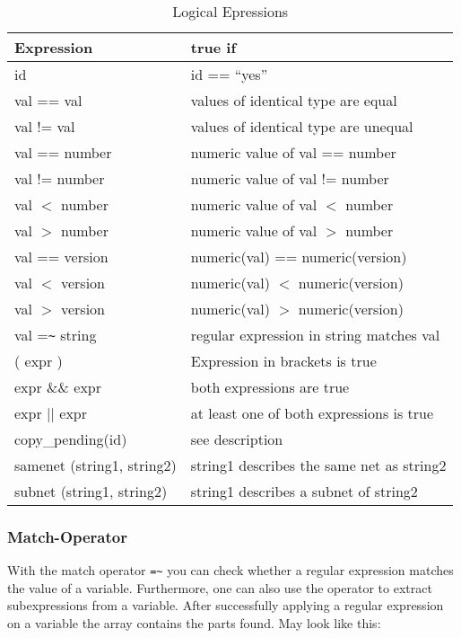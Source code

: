     \begin{table}[htb]
      \centering
      \caption{Logical Epressions}
      \label{tab:expr}
      \begin{tabular}{ll}
        \hline
        Expression &                     true if\\
        \hline
        \hline
       id                    &    id == ``yes''\\
       val  == val           &    values of identical type are equal\\
       val  != val           &    values of identical type are unequal\\
       val  == number        &    numeric value of val == number\\
       val  != number        &    numeric value of val != number\\
       val  $<$  number      &    numeric value of val $<$ number\\
       val  $>$  number      &    numeric value of val $>$ number\\
       val  == version       &    numeric(val) == numeric(version) \\
       val  $<$  version     &    numeric(val) $<$  numeric(version) \\
       val  $>$  version     &    numeric(val) $>$  numeric(version) \\
       val  =\verb?~? string &    regular expression in string matches val\\
       ( expr )              &    Expression in brackets is true\\
       expr \&\& expr        &    both expressions are true\\
       expr || expr          &    at least one of both expressions is true\\
       copy\_pending(id)     &    see description\\
       samenet (string1, string2) & string1 describes the same net as string2\\
       subnet (string1, string2)  & string1 describes a subnet of string2\\
        \hline
      \end{tabular}
    \end{table}

\subsubsection{Match-Operator}

With the match operator \verb?=~? you can check whether a regular
expression matches the value of a variable. Furthermore, one can
also use the operator to extract subexpressions from a variable.
After successfully applying a regular expression on a variable
the array  contains the parts found. May look
like this:

